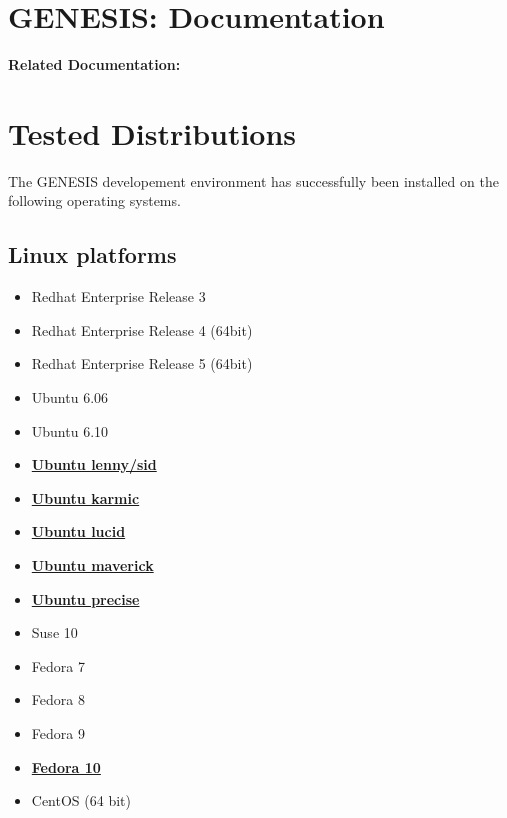 \documentclass[12pt]{article}
\begin{document}
\section*{GENESIS: Documentation}

{\bf Related Documentation:}

\section*{Tested Distributions}

The GENESIS developement environment has successfully been installed on the following operating systems.

\subsection*{Linux platforms}

\begin{itemize}
\item Redhat Enterprise Release 3
\item Redhat Enterprise Release 4 (64bit)
\item Redhat Enterprise Release 5 (64bit)
\item Ubuntu 6.06
\item Ubuntu 6.10
\item \href{../installation-ubuntu-lennysid/installation-ubuntu-lennysid.tex}{\bf Ubuntu lenny/sid}
\item \href{../installation-ubuntu-karmic/installation-ubuntu-karmic.tex}{\bf Ubuntu karmic}
\item \href{../installation-ubuntu-lucid/installation-ubuntu-lucid.tex}{\bf Ubuntu lucid}
\item \href{../installation-ubuntu-maverick/installation-ubuntu-maverick.tex}{\bf Ubuntu maverick}
\item \href{../installation-ubuntu-precise/installation-ubuntu-precise.tex}{\bf Ubuntu precise}
\item Suse 10
\item Fedora 7
\item Fedora 8
\item Fedora 9
\item \href{../installation-fedora10/installation-fedora10.tex}{\bf Fedora 10}
\item CentOS (64 bit)%
\end{itemize}
\end{document}
